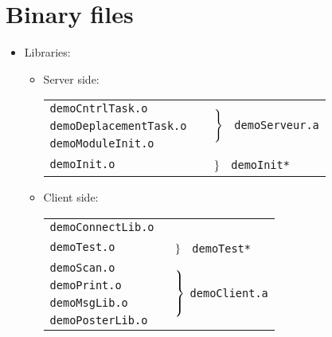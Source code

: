 \vfill\eject
\section{Binary files}

\begin{itemize}

\item Libraries:

	\begin{itemize}
	\item Server side:

		\vspace{.3cm}
		{\small
		\begin{tabular}{ll}
		\cline{1-1}
		\tt demoCntrlTask.o &
			\multirow{3}{3.5cm}{\
			$\left.{\vrule width 0pt height .6cm} \right\}$ \
			\tt demoServeur.a} \\
		\tt demoDeplacementTask.o \\
		\tt demoModuleInit.o	\\
		\cline{1-1}
		\tt demoInit.o		
		    & 	\multirow{1}{3.5cm}{\
		      	$\left.{\vrule width 0pt} \right\}$
		      	\tt ~demoInit*}  \\
		\cline{1-1}
		\end{tabular}
		}
		\vspace{.3cm}

	\item Client side:

		\vspace{.3cm}
		{\small
		\begin{tabular}{ll}
		\cline{1-1}
		\tt demoConnectLib.o \\
		\cline{1-1}
		\tt demoTest.o 
		    & 	\multirow{1}{3.5cm}{
		      	$\left.{\vrule width 0pt} \right\}$
		      	\tt ~demoTest*}  \\
		\cline{1-1}
		\tt demoScan.o	
		    &	\multirow{4}{3.5cm}{
			$\left.{\vrule width 0pt height .8cm} \right\}$
			\tt demoClient.a}\\
		\tt demoPrint.o		\\
		\tt demoMsgLib.o	\\
		\tt demoPosterLib.o	\\
		\cline{1-1}
		\end{tabular}
		}
	\end{itemize}

\end{itemize}
